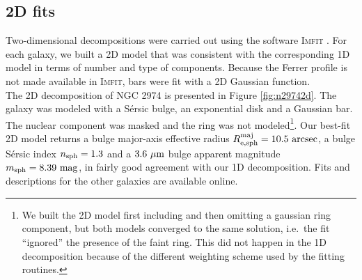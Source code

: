 \documentclass[preprint2]{emulateapj}
\begin{document}
%
%

\subsection{2D fits}
\label{sec:2d}
Two-dimensional decompositions were carried out using the software \textsc{Imfit} \citep{imfit}.
For each galaxy, we built a 2D model that was consistent with the corresponding 1D model in terms of number and type of components. 
Because the Ferrer profile is not made available in \textsc{Imfit},
bars were fit with a 2D Gaussian function. \\
The 2D decomposition of NGC 2974 is presented in Figure \ref{fig:n29742d}. 
The galaxy was modeled with a S\'ersic bulge, an exponential disk and a Gaussian bar.
The nuclear component was masked and the ring was not 
modeled\footnote{We built the 2D model first including and then omitting a gaussian ring component, 
but both models converged to the same solution, i.e.~the fit ``ignored'' the presence of the faint ring. 
This did not happen in the 1D decomposition because of the different weighting scheme used by the fitting routines.}. 
Our best-fit 2D model returns a bulge major-axis effective radius $R_{\rm e,sph}^{\rm maj} = 10.5~\rm arcsec$, 
a bulge S\'ersic index $n_{\rm sph} = 1.3$ and a $3.6~\rm \mu m$ bulge apparent magnitude $m_{\rm sph} = 8.39~\rm mag$, 
in fairly good agreement with our 1D decomposition. 
Fits and descriptions for the other galaxies are available online.
\end{document}
